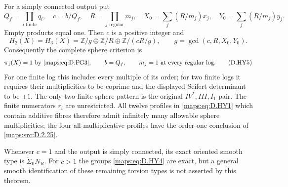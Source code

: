 \begin{theorem}
For a simply connected output put
\[
 Q_f=\prod_{i\text{ finite}}q_i,\quad c=b/Q_f,\quad
 R=\prod_{j\text{ regular}}m_j,
 \quad X_0=\sum_j(R/m_j)x_j,\quad Y_0=\sum_j(R/m_j)y_j.
\]
Empty products equal one. Then $c$ is a positive integer and
\[
 H_2(X)=H_3(X)=
 \mathbb Z/g\oplus\mathbb Z/R\oplus\mathbb Z/(cR/g),
 \qquad g=\gcd(c,R,X_0,Y_0).                                \tag{D.HY4}\label{maps:eq:D.HY4}
\]
Consequently the complete sphere criterion is
\[
 \pi_1(X)=1\text{ by \eqref{maps:eq:D.FG3}},\qquad b=Q_f,
 \qquad m_j=1\text{ at every regular log}.                  \tag{D.HY5}\label{maps:eq:D.HY5}
\]
For one finite log this includes every multiple of its order; for
two finite logs it requires their multiplicities to be coprime and
the displayed Seifert determinant to be $\pm1$. The only two-finite
sphere pattern is the original $IV^*,III,I_1$ pair. The finite
numerators $r_i$ are unrestricted. All twelve profiles in \eqref{maps:eq:D.HY1}
which contain additive fibres therefore admit infinitely many
allowable sphere multiplicities; the four all-multiplicative
profiles have the order-one conclusion of \ref{maps:src:D.2.25}.

Whenever $c=1$ and the output is simply connected, its exact oriented
smooth type is $\widetilde\Sigma_0N_R$. For $c>1$ the groups \eqref{maps:eq:D.HY4}
are exact, but a general smooth identification of these remaining
torsion types is not asserted by this theorem.

\end{theorem}


